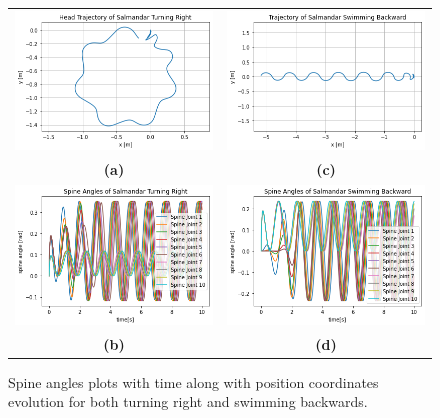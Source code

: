 \documentclass{cmc}
\begin{document}
\begin{figure}[H]
\centering
\begin{tabular}{cc}
\includegraphics[height=0.3\columnwidth]{figures/8d_turn_traj_2.png} &
\includegraphics[height=0.3\columnwidth]{figures/8d_back_traj.png} \\
\textbf{(a)} & \textbf{(c)} \\
\includegraphics[height=0.3\columnwidth]{figures/8d_turn_spine_2.png} &
\includegraphics[height=0.3\columnwidth]{figures/8d_back_spine.png} \\
\textbf{(b)} & \textbf{(d)}
\end{tabular}
\caption{Spine angles plots with time along with position coordinates evolution for both turning right and swimming backwards.}
\label{c}
\end{figure}
\end{document}
